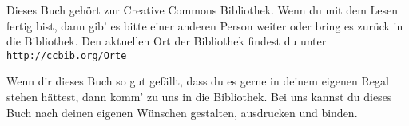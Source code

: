 \raggedright

Dieses Buch gehört zur Creative Commons Bibliothek. Wenn du mit dem
Lesen fertig bist, dann gib' es bitte einer anderen Person weiter
oder bring es zurück in die Bibliothek. Den aktuellen Ort der
Bibliothek findest du unter\\ \texttt{http://ccbib.org/Orte}

Wenn dir dieses Buch so gut gefällt, dass du es gerne in deinem
eigenen Regal stehen hättest, dann komm' zu uns in die Bibliothek.
Bei uns kannst du dieses Buch nach deinen eigenen Wünschen
gestalten, ausdrucken und binden.

